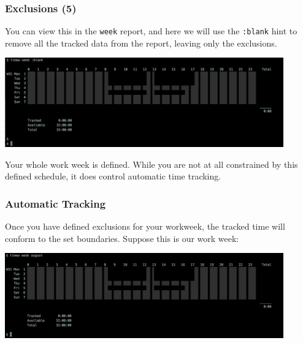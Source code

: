 \documentclass[t,handout]{beamer}
\begin{document}
\begin{frame}[fragile]\frametitle{Exclusions (5)}
    \vfill
    You can view this in the \verb=week= report, and here we will use the \verb=:blank= hint to remove all the tracked data from the report, leaving only the exclusions.

    \includegraphics[width=12cm]{images/tutorial34.png}

    Your whole work week is defined. While you are not at all constrained by this defined schedule, it does control automatic time tracking.
\end{frame}

\begin{frame}[fragile]\frametitle{Automatic Tracking}
    \vfill
    Once you have defined exclusions for your workweek, the tracked time will conform to the set boundaries. Suppose this is our work week:

    \includegraphics[width=12cm]{images/tutorial35.png}
\end{frame}
\end{document}
